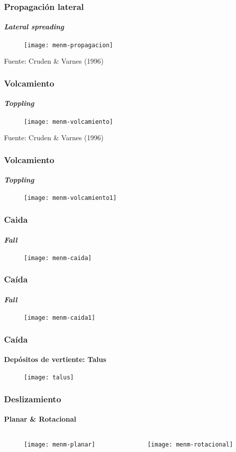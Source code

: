 \documentclass[12pt]{beamer}
\begin{document}
\begin{frame}
\frametitle{Propagación lateral}
\framesubtitle{\emph{Lateral spreading}}
\begin{figure}
\centering
\texttt{[image: menm-propagacion]} 
\end{figure}
\tiny{Fuente: Cruden \& Varnes (1996)}
\end{frame}
\begin{frame}
\frametitle{Volcamiento}
\framesubtitle{\emph{Toppling}}
\begin{figure}
\centering
\texttt{[image: menm-volcamiento]} 
\end{figure}
\tiny{Fuente: Cruden \& Varnes (1996)}
\end{frame}
\begin{frame}
\frametitle{Volcamiento}
\framesubtitle{\emph{Toppling}}
\begin{figure}
\centering
\texttt{[image: menm-volcamiento1]} 
\end{figure}
\end{frame}
\begin{frame}
\frametitle{Caida}
\framesubtitle{\emph{Fall}}
\begin{figure}
\centering
\texttt{[image: menm-caida]} 
\end{figure}
\end{frame}
\begin{frame}
\frametitle{Caída}
\framesubtitle{\emph{Fall}}
\begin{figure}
\centering
\texttt{[image: menm-caida1]} 
\end{figure}
\end{frame}
\begin{frame}
\frametitle{Caída}
\framesubtitle{Depósitos de vertiente: Talus}
\begin{figure}
\centering
\texttt{[image: talus]} 
\end{figure}
\end{frame}
\begin{frame}
\frametitle{Deslizamiento}
\framesubtitle{Planar \& Rotacional}
\begin{columns}
\begin{column}{0.5\textwidth}
\begin{figure}
\centering
\texttt{[image: menm-planar]} 
\end{figure}
\end{column}
\begin{column}{0.5\textwidth}
\begin{figure}
\centering
\texttt{[image: menm-rotacional]} 
\end{figure}
\end{column}
\end{columns}
\end{frame}
\end{document}
